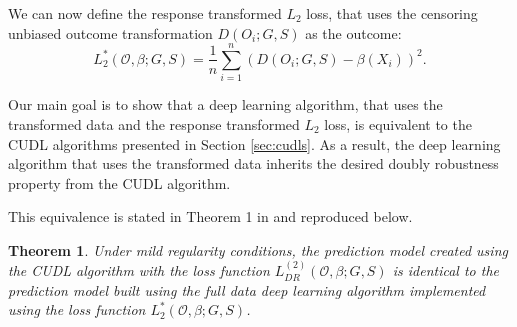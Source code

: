\documentclass[12pt, a4paper]{scrartcl}
\theoremstyle{definition}
\theoremstyle{plain}
\newtheorem{Theorem}{Theorem}[section]
\numberwithin{equation}{section}
\numberwithin{figure}{section}
\numberwithin{table}{section}
\begin{document}
	We can now define the response transformed $L_2$ loss, that uses the censoring unbiased outcome transformation $D(O_i;G,S)$ as the outcome:
	\begin{equation*}
	L_2^*(\mathcal{O}, \beta; G,S) = \frac{1}{n} \sum_{i=1}^n (D(O_i;G,S)-\beta(X_i))^2.
	\end{equation*}
	
	Our main goal is to show that a deep learning algorithm, that uses the transformed data and the response transformed $L_2$ loss, is equivalent to the CUDL algorithms presented in Section \ref{sec:cudls}.
	As a result, the deep learning algorithm that uses the transformed data inherits the desired doubly robustness property from the CUDL algorithm.
	
	This equivalence is stated in Theorem 1 in \citet*{basearticle} and reproduced below.
	
	\begin{Theorem}\label{thm:equi}
		Under mild regularity conditions, the prediction model created using the CUDL algorithm with the loss function $L_{DR}^{(2)}(\mathcal{O}, \beta; G,S)$ is identical to the prediction model built using the full data deep learning algorithm implemented using the loss function $L_2^*(\mathcal{O}, \beta; G,S)$.
	\end{Theorem}
	
\end{document}
